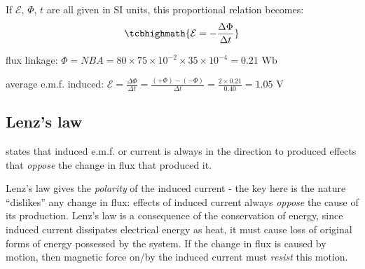 If $\mathcal{E}$, $\Phi$, $t$ are all given in SI units, this proportional relation becomes: $$\tcbhighmath{\mathcal{E} = -\frac{\Delta \Phi}{\Delta t}}$$


\begin{soln} flux linkage: $\Phi = NBA = 80 \times 75\times10^{-2} \times 35 \times 10^{-4} = 0.21 \text{ Wb}$

average e.m.f. induced: $\mathcal{E} = \frac{\Delta \Phi}{\Delta t} = \frac{(+\Phi)-(-\Phi)}{\Delta t} = \frac{2\times 0.21}{0.40} = 1.05 \text{ V}$ \end{soln}

\subsection{Lenz's law}

\rcyskip

\begin{ilight}
	 states that induced e.m.f. or current is always in the direction to produced effects that \emph{oppose} the change in flux that produced it.
\end{ilight}

\cmt Lenz's law gives the \emph{polarity} of the induced current - the key here is the nature ``dislikes'' any change in flux: effects of induced current always \emph{oppose} the cause of its production. Lenz's law is a consequence of the conservation of energy, since induced current dissipates electrical energy as heat, it must cause loss of original forms of energy possessed by the system. If the change in flux is caused by motion, then magnetic force on/by the induced current must \emph{resist} this motion.



